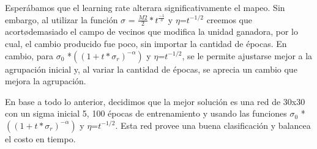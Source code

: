 Esper\'abamos que el learning rate alterara significativamente el mapeo. Sin embargo, al utilizar la funci\'on $\sigma$ = $\frac{M2}{2}*t^\frac{-1}{3}$ y $\eta$=$t^{-1/2}$  creemos que acort\o demasiado el campo de vecinos que modifica la unidad ganadora, por lo cual, el cambio producido fue poco, sin importar la cantidad de \'epocas.
En cambio, para $\sigma_0$ *$((1+t*\sigma_r)^{-\alpha})$ y $\eta$=$t^{-1/2}$, se le permite ajustarse mejor a la agrupaci\'on inicial y, al variar la cantidad de \'epocas, se aprecia un cambio que mejora la agrupaci\'on.

En base a todo lo anterior, decidimos que la mejor soluci\'on es una red de 30x30 con un sigma inicial 5, 100 \'epocas de entrenamiento y usando las funciones $\sigma_0$ *$((1+t*\sigma_r)^{-\alpha})$ 
y $\eta$=$t^{-1/2}$. Esta red provee una buena clasificaci\'on y balancea el costo en tiempo.

